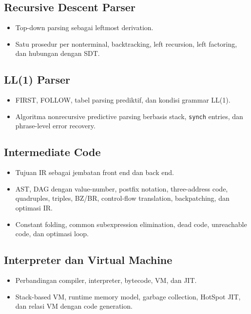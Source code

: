 \documentclass[11pt,a4paper]{article}
\begin{document}
\subsection{Recursive Descent Parser}
\begin{itemize}
    \item Top-down parsing sebagai leftmost derivation.
    \item Satu prosedur per nonterminal, backtracking, left recursion, left factoring, dan hubungan dengan SDT.
\end{itemize}

\subsection{LL(1) Parser}
\begin{itemize}
    \item FIRST, FOLLOW, tabel parsing prediktif, dan kondisi grammar LL(1).
    \item Algoritma nonrecursive predictive parsing berbasis stack, \texttt{synch} entries, dan phrase-level error recovery.
\end{itemize}

\subsection{Intermediate Code}
\begin{itemize}
    \item Tujuan IR sebagai jembatan front end dan back end.
    \item AST, DAG dengan value-number, postfix notation, three-address code, quadruples, triples, BZ/BR, control-flow translation, backpatching, dan optimasi IR.
    \item Constant folding, common subexpression elimination, dead code, unreachable code, dan optimasi loop.
\end{itemize}

\subsection{Interpreter dan Virtual Machine}
\begin{itemize}
    \item Perbandingan compiler, interpreter, bytecode, VM, dan JIT.
    \item Stack-based VM, runtime memory model, garbage collection, HotSpot JIT, dan relasi VM dengan code generation.
\end{itemize}

\newpage

\newpage

\newpage

\newpage

\newpage

\newpage

\newpage

\newpage

\end{document}

